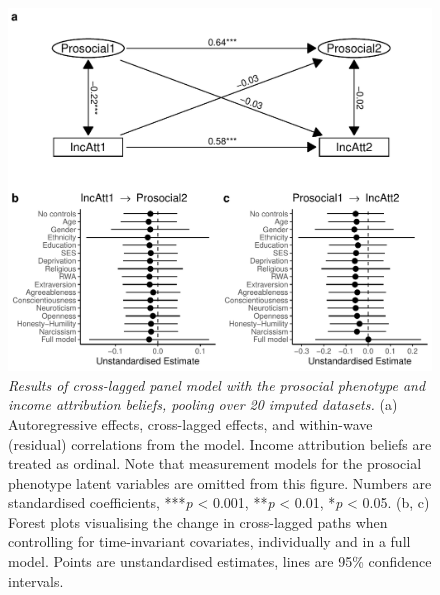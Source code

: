 \documentclass[
  man,floatsintext]{apa6}
\begin{document}
\begin{figure}
\centering
\includegraphics{manuscript_files/figure-latex/clpmPlotIncAttdMReduced-1.pdf}
\caption{\label{fig:clpmPlotIncAttdMReduced}\emph{Results of cross-lagged panel model with
the prosocial phenotype and income attribution beliefs, pooling over 20 imputed
datasets.} (a) Autoregressive effects, cross-lagged effects, and within-wave
(residual) correlations from the model. Income attribution beliefs are treated
as ordinal. Note that measurement models for the prosocial phenotype latent
variables are omitted from this figure. Numbers are standardised coefficients,
***\emph{p} \textless{} 0.001, **\emph{p} \textless{} 0.01, *\emph{p} \textless{} 0.05. (b, c) Forest plots visualising
the change in cross-lagged paths when controlling for time-invariant covariates,
individually and in a full model. Points are unstandardised estimates, lines are
95\% confidence intervals.}
\end{figure}

\newpage
\end{document}
